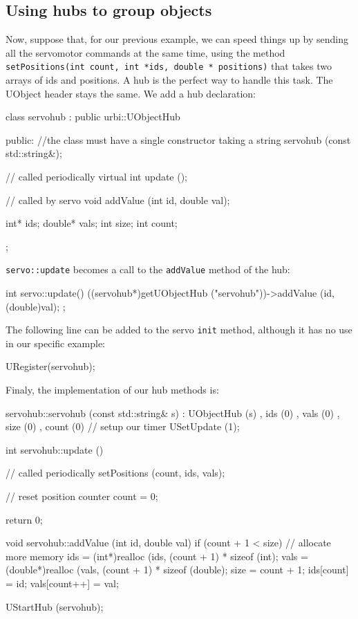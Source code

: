 \subsection{Using hubs to group objects}

Now, suppose that, for our previous example, we can speed things up by
sending all the servomotor commands at the same time, using the method
\lstinline{setPositions(int count, int *ids, double * positions)} that
takes two arrays of ids and positions. A hub is the perfect way to
handle this task. The UObject header stays the same. We add a hub
declaration:

\begin{cxx}
class servohub : public urbi::UObjectHub
{
public:
  //the class must have a single constructor taking a string
  servohub (const std::string&);

  // called periodically
  virtual int update ();

  // called by servo
  void addValue (int id, double val);

  int* ids;
  double* vals;
  int size;
  int count;
};
\end{cxx}

\lstinline{servo::update} becomes a call to the \lstinline{addValue}
method of the hub:

\begin{cxx}
int
servo::update()
{
  ((servohub*)getUObjectHub ("servohub"))->addValue (id, (double)val);
};
\end{cxx}

The following line can be added to the servo \lstinline{init} method,
although it has no use in our specific example:

\begin{cxx}
URegister(servohub);
\end{cxx}

Finaly, the implementation of our hub methods is:

\begin{cxx}
servohub::servohub (const std::string& s)
  : UObjectHub (s)
  , ids   (0)
  , vals  (0)
  , size  (0)
  , count (0)
{
  // setup our timer
  USetUpdate (1);
}

int
servohub::update ()
{
  // called periodically
  setPositions (count, ids, vals);

  // reset position counter
  count = 0;

  return 0;
}

void
servohub::addValue (int id, double val)
{
  if (count + 1 < size)
  {
    // allocate more memory
    ids = (int*)realloc (ids, (count + 1) * sizeof (int);
    vals = (double*)realloc (vals, (count + 1) * sizeof (double);
    size = count + 1;
  }
  ids[count] = id;
  vals[count++] = val;
}

UStartHub (servohub);
\end{cxx}

